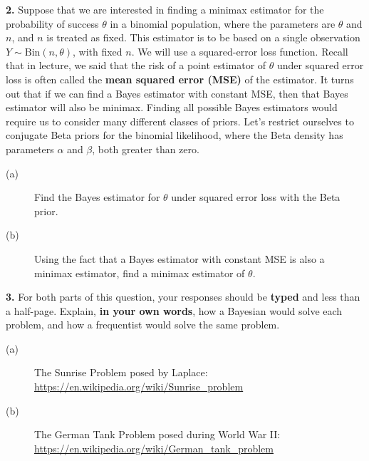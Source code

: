 \documentclass[12pt]{article}
\begin{document}
\bigskip
\textbf{2.} Suppose that we are interested in finding a minimax estimator for the probability of success $\theta$ in a binomial population, where the parameters are $\theta$ and $n$, and $n$ is treated as fixed. This estimator is to be based on a single observation $Y \sim \text{Bin}(n, \theta)$, with fixed $n$. We will use a squared-error loss function. Recall that in lecture, we said that the risk of a point estimator of $\theta$ under squared error loss is often called the \textbf{mean squared error (MSE)} of the estimator. It turns out that if we can find a Bayes estimator with constant MSE, then that Bayes estimator will also be minimax. Finding all possible Bayes estimators would require us to consider many different classes of priors. Let's restrict ourselves to conjugate Beta priors for the binomial likelihood, where the Beta density has parameters $\alpha$ and $\beta$, both greater than zero.
\begin{description}
\item[(a)] Find the Bayes estimator for $\theta$ under squared error loss with the Beta prior.
\item[(b)] Using the fact that a Bayes estimator with constant MSE is also a minimax estimator, find a minimax estimator of $\theta$.
\end{description}


\bigskip
\textbf{3.} For both parts of this question, your responses should be \textbf{typed} and less than a half-page. Explain, \textbf{in your own words}, how a Bayesian would solve each problem, and how a frequentist would solve the same problem.  \begin{description}
\item[(a)] The Sunrise Problem posed by Laplace:\\
\url{https://en.wikipedia.org/wiki/Sunrise_problem}

\item[(b)] The German Tank Problem posed during World War II:\\
\url{https://en.wikipedia.org/wiki/German_tank_problem}

\end{description}
\end{document}
